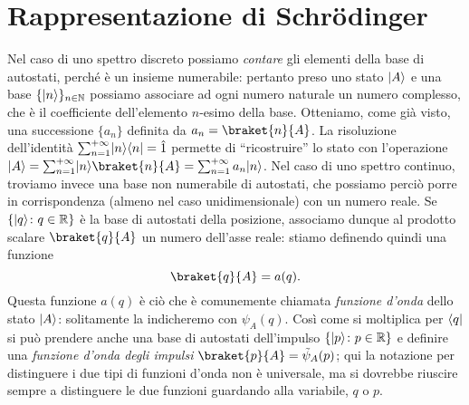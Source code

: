 \section{Rappresentazione di Schr\"odinger}
Nel caso di uno spettro discreto possiamo \emph{contare} gli elementi della base di autostati, perch\'e è un insieme numerabile: pertanto preso uno stato $\lvert A\rangle$ e una base $\{\lvert n\rangle\}_{n\in\mathbb{N}}$ possiamo associare ad ogni numero naturale un numero complesso, che è il coefficiente dell'elemento $n$-esimo della base.
Otteniamo, come già visto, una successione $\{a_n\}$ definita da $a_n=\braket{n}{A}$.
La risoluzione dell'identità $\sum_{n=1}^{+\infty}\lvert n\rangle\langle n\rvert=\hat{1}$ permette di ``ricostruire'' lo stato con l'operazione $\ket{A}=\sum_{n=1}^{+\infty}\ket{n}\braket{n}{A}=\sum_{n=1}^{+\infty}a_n\ket{n}$.
Nel caso di uno spettro continuo, troviamo invece una base non numerabile di autostati, che possiamo perciò porre in corrispondenza (almeno nel caso unidimensionale) con un numero reale.
Se $\{\lvert q\rangle\colon q\in\mathbb{R}\}$ è la base di autostati della posizione, associamo dunque al prodotto scalare $\braket{q}{A}$ un numero dell'asse reale: stiamo definendo quindi una funzione
\begin{equation}
	\braket{q}{A}=a(q).
\end{equation}
Questa funzione $a(q)$ è ciò che è comunemente chiamata \emph{funzione d'onda} dello stato $\lvert A\rangle$: solitamente la indicheremo con $\psi_A(q)$.
Cos\`i come si moltiplica per $\langle q\rvert$ si può prendere anche una base di autostati dell'impulso $\{\lvert p\rangle\colon p\in\mathbb{R}\}$ e definire una \emph{funzione d'onda degli impulsi}	$\braket{p}{A}=\tilde{\psi}_A(p)$; qui la notazione per distinguere i due tipi di funzioni d'onda non è universale, ma si dovrebbe riuscire sempre a distinguere le due funzioni guardando alla variabile, $q$ o $p$.

